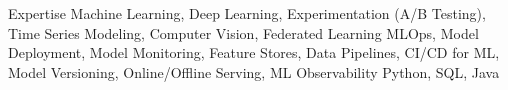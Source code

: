 
\begin{rubric}{Expertise}
\entry*[AI Skills]
	Machine Learning, Deep Learning, Experimentation (A/B Testing), Time Series Modeling, Computer Vision, Federated Learning
	MLOps, Model Deployment, Model Monitoring, Feature Stores, Data Pipelines, CI/CD for ML, Model Versioning, Online/Offline Serving, ML Observability
\entry*[Programming]
	Python, SQL, Java
\end{rubric}

